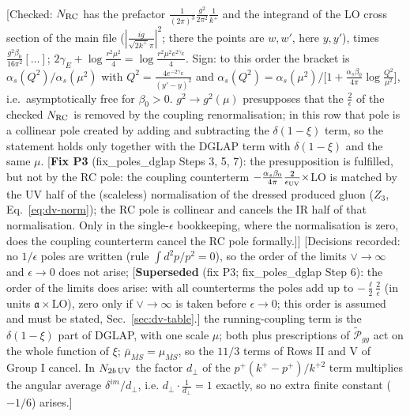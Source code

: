 \documentclass[9pt]{article}
\numberwithin{equation}{section}
\begin{document}
\begin{align}
\end{align} {\color{red}[Checked: $N_{\rm RC}$ has the prefactor $\frac{1}{(2\pi)^{3}}\frac{g^{2}}{2\pi^{2}}\frac{1}{k^{+}}$ and the integrand of the LO cross section of the main file ($|\frac{ig}{\sqrt{2k^{+}}\pi}|^{2}$; there the points are $w,w'$, here $y,y'$), times $\frac{g^{2}\beta_{0}}{16\pi^{2}}[\dots]$; $2\gamma_{E}+\log\frac{r^{2}\mu^{2}}{4}=\log\frac{r^{2}\mu^{2}e^{2\gamma_{E}}}{4}$. Sign: to this order the bracket is $\alpha_{s}(Q^{2})/\alpha_{s}(\mu^{2})$ with $Q^{2}=\frac{4e^{-2\gamma_{E}}}{(y'-y)^{2}}$ and $\alpha_{s}(Q^{2})=\alpha_{s}(\mu^{2})\big/\big[1+\frac{\alpha_{s}\beta_{0}}{4\pi}\log\frac{Q^{2}}{\mu^{2}}\big]$, i.e.\ asymptotically free for $\beta_{0}>0$. $g^{2}\to g^{2}(\mu)$ presupposes that the $\frac{2}{\epsilon}$ of the checked $N_{\rm RC}$ is removed by the coupling renormalisation; in this row that pole is a collinear pole created by adding and subtracting the $\delta(1-\xi)$ term, so the statement holds only together with the DGLAP term with $\delta(1-\xi)$ and the same $\mu$. {\color{red}[\textbf{Fix P3} (fix\_poles\_dglap Steps 3, 5, 7): the presupposition is fulfilled, but not by the RC pole: the coupling counterterm $-\frac{\alpha_{s}\beta_{0}}{4\pi}\frac{2}{\epsilon_{\rm UV}}\times$LO is matched by the UV half of the (scaleless) normalisation of the dressed produced gluon ($Z_{3}$, Eq.~\eqref{eq:dv-norm}); the RC pole is collinear and cancels the IR half of that normalisation. Only in the single-$\epsilon$ bookkeeping, where the normalisation is zero, does the coupling counterterm cancel the RC pole formally.]}]} {\color{red}[Decisions recorded: no $1/\epsilon$ poles are written (rule $\int d^{2}p/p^{2}=0$), {\color{teal}so the order of the limits $\vee\to\infty$ and $\epsilon\to0$ does not arise;} {\color{red}[\textbf{Superseded} (fix P3; fix\_poles\_dglap Step 6): the order of the limits does arise: with all counterterms the poles add up to $-\frac{\ell}{2}\frac{2}{\epsilon}$ (in units $\mathfrak{a}\times$LO), zero only if $\vee\to\infty$ is taken before $\epsilon\to0$; this order is assumed and must be stated, Sec.~\ref{sec:dv-table}.]} the running-coupling term is the $\delta(1-\xi)$ part of DGLAP, with one scale $\mu$; both plus prescriptions of $\widetilde{\mathcal{P}}_{gg}$ act on the whole function of $\xi$; $\bar\mu_{\overline{MS}}=\mu_{\overline{MS}}$, so the $11/3$ terms of Rows II and V of Group I cancel. In $N_{2b\,\rm UV}$ the factor $d_{\perp}$ of the $p^{+}(k^{+}-p^{+})/k^{+2}$ term multiplies the angular average $\delta^{im}/d_{\perp}$, i.e. $d_{\perp}\cdot\frac{1}{d_{\perp}}=1$ exactly, so no extra finite constant ($-1/6$) arises.]}\par\noindent
\end{document}
